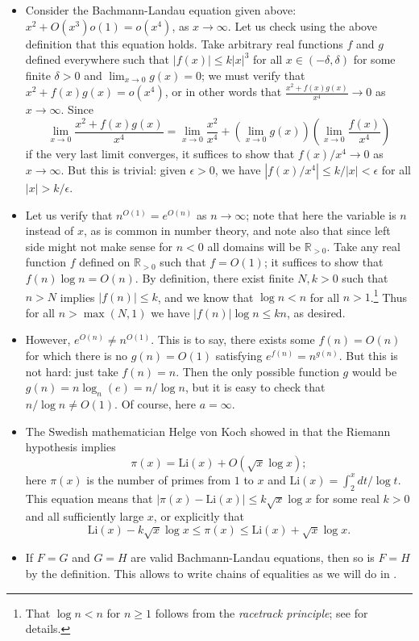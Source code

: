\documentclass{article}
\theoremstyle{definition}
\newcommand\RR{\mathbb R}
\newcommand\abs[1]{\left\lvert#1\right\rvert}
\newcommand\Li{\mathrm{Li}}
\begin{document}
\begin{itemize}
    \item Consider the Bachmann-Landau equation given above: \(x^2 + O(x^3)o(1) = o(x^4)\), as \(x\to\infty\).
        Let us check using the above definition that this equation holds.
        Take arbitrary real functions \(f\) and \(g\) defined everywhere such that \(\abs{f(x)} \leq k\abs{x}^3\) for all \(x\in(-\delta,\delta)\) for some finite \(\delta>0\) and \(\lim_{x\to 0} g(x) = 0\); we must verify that \(x^2 + f(x)g(x) = o(x^4)\), or in other words that \(\frac{x^2 + f(x)g(x)}{x^4}\to 0\) as \(x\to\infty\).
        Since
        \[\lim_{x\to 0} \frac{x^2 + f(x)g(x)}{x^4} = \lim_{x\to 0} \frac{x^2}{x^4} + \left(\lim_{x\to 0} g(x)\right)\left(\lim_{x\to 0} \frac{f(x)}{x^4}\right)\]
        if the very last limit converges, it suffices to show that \(f(x)/x^4 \to 0\) as \(x\to\infty\).
        But this is trivial: given \(\epsilon > 0\), we have \(\abs{f(x)/x^4} \le k/\abs{x} < \epsilon\) for all \(\abs{x} > k/\epsilon\).

    \item Let us verify that \(n^{O(1)} = e^{O(n)}\) as \(n\to\infty\); note that here the variable is \(n\) instead of \(x\), as is common in number theory, and note also that since left side might not make sense for \(n<0\) all domains will be \(\RR_{>0}\).
        Take any real function \(f\) defined on \(\RR_{>0}\) such that \(f = O(1)\); it suffices to show that \(f(n)\log n = O(n)\).
        By definition, there exist finite \(N,k>0\) such that \(n>N\) implies \(\abs{f(n)} \le k\), and we know that \(\log n < n\) for all \(n>1\).\footnote{That \(\log n < n\) for \(n\ge 1\) follows from the \textit{racetrack principle}; see \cite{Spivey2011} for details.}
        Thus for all \(n > \max(N,1)\) we have \(\abs{f(n)}\log n \le kn\), as desired.

    \item However, \(e^{O(n)} \ne n^{O(1)}\).
        This is to say, there exists some \(f(n) = O(n)\) for which there is no \(g(n) = O(1)\) satisfying \(e^{f(n)} = n^{g(n)}\).
        But this is not hard: just take \(f(n) = n\).
        Then the only possible function \(g\) would be \(g(n) = n\log_n(e) = n/\log n\), but it is easy to check that \(n/\log n \ne O(1)\).
        Of course, here \(a=\infty\).

    \item The Swedish mathematician Helge von Koch showed in \cite{Koch1901} that the Riemann hypothesis implies
        \[\pi(x) = \Li(x) + O(\sqrt x \log x);\]
        here \(\pi(x)\) is the number of primes from \(1\) to \(x\) and \(\Li(x) = \int_2^x dt/\log t\).
        This equation means that \(\abs{\pi(x) - \Li(x)} \le k\sqrt x \log x\) for some real \(k>0\) and all sufficiently large \(x\), or explicitly that
        \[\Li(x) - k\sqrt x \log x \le \pi(x) \le \Li(x) + \sqrt x\log x.\]

    \item If \(F=G\) and \(G=H\) are valid Bachmann-Landau equations, then so is \(F=H\) by the definition.
        This allows to write chains of equalities as we will do in .
\end{itemize}
\end{document}
